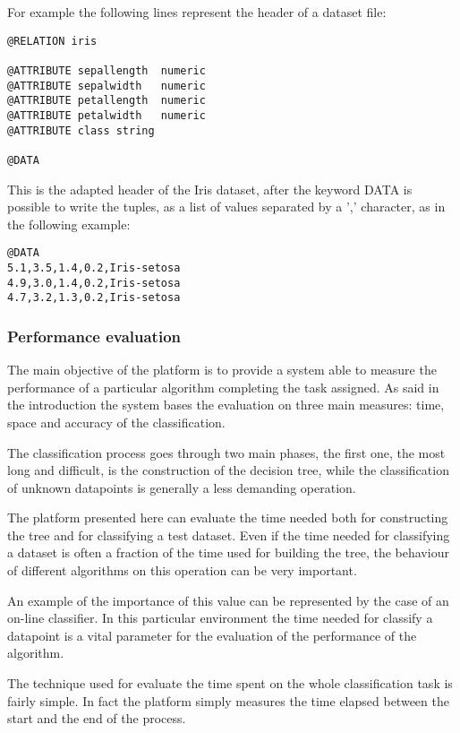 \documentclass{acm_proc_article-sp-sigmod07}
\begin{document}
For example the following lines represent the header of a dataset file:

\begin{verbatim}
@RELATION iris

@ATTRIBUTE sepallength	numeric
@ATTRIBUTE sepalwidth 	numeric
@ATTRIBUTE petallength 	numeric
@ATTRIBUTE petalwidth	numeric
@ATTRIBUTE class string 

@DATA
\end{verbatim}

This is the adapted header of the Iris dataset, after the keyword DATA
is possible to write the tuples, as a list of values separated by a ','
character, as in the following example:

\begin{verbatim}
@DATA
5.1,3.5,1.4,0.2,Iris-setosa
4.9,3.0,1.4,0.2,Iris-setosa
4.7,3.2,1.3,0.2,Iris-setosa
\end{verbatim}

\subsubsection{Performance evaluation}
The main objective of the platform is to provide a system able to measure
the performance of a particular algorithm completing the task assigned.
As said in the introduction the system bases the evaluation on three main
measures: time, space and accuracy of the classification.

The classification process goes through two main phases, the first one,
the most long and difficult, is the construction of the decision tree,
while the classification of unknown datapoints is generally a less
demanding operation.

The platform presented here can evaluate the time needed both for
constructing the tree and for classifying a test dataset. 
Even if the time needed for classifying a dataset is often a fraction of
the time used for building the tree, the behaviour of different algorithms
on this operation can be very important.

An example of the importance of this value can be represented by the case
of an on-line classifier. In this particular environment the time needed
for classify a datapoint is a vital parameter for the evaluation of the
performance of the algorithm.

The technique used for evaluate the time spent on the whole classification
task is fairly simple. In fact the platform simply measures the time
elapsed between the start and the end of the process.
\end{document}
